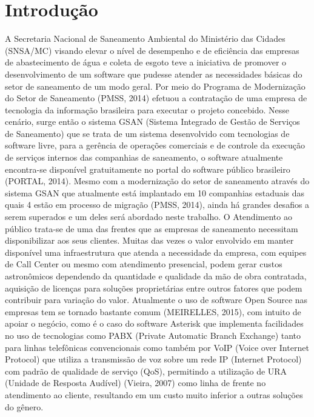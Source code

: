 \chapter*[Introdução]{Introdução}



A Secretaria Nacional de Saneamento Ambiental do Ministério das Cidades (SNSA/MC) visando elevar o nível de desempenho e de eficiência das empresas de abastecimento de água e coleta de esgoto teve a iniciativa de promover o desenvolvimento de um software que pudesse atender as necessidades básicas do setor de saneamento de um modo geral. Por meio do Programa de Modernização do Setor de Saneamento (PMSS, 2014) efetuou a contratação de uma empresa de tecnologia da informação brasileira para executar o projeto concebido.  Nesse cenário, surge então o sistema GSAN (Sistema Integrado de Gestão de Serviços de Saneamento) que se trata de um sistema desenvolvido com tecnologias de software livre, para a gerência de operações comerciais e de controle da execução de serviços internos das companhias de saneamento, o software atualmente encontra-se disponível gratuitamente no portal do software público brasileiro (PORTAL, 2014). Mesmo com a modernização do setor de saneamento através do sistema GSAN que atualmente está implantado em 10 companhias estaduais das quais 4 estão em processo de migração (PMSS, 2014), ainda há grandes desafios a serem superados e um deles será abordado neste trabalho.
O Atendimento ao público trata-se de uma das frentes que as empresas de saneamento necessitam disponibilizar aos seus clientes. Muitas das vezes o valor envolvido em manter disponível uma infraestrutura que atenda a necessidade da empresa, com equipes de Call Center ou mesmo com atendimento presencial, podem gerar custos astronômicos dependendo da quantidade e qualidade da mão de obra contratada, aquisição de licenças para soluções proprietárias entre outros fatores que podem contribuir para variação do valor. Atualmente o uso de software Open Source nas empresas tem se tornado bastante comum (MEIRELLES, 2015), com intuito de apoiar o negócio, como é o caso do software Asterisk que implementa facilidades no uso de tecnologias como PABX (Private Automatic Branch Exchange)  tanto para linhas telefônicas convencionais como também por VoIP (Voice over Internet Protocol) que utiliza a transmissão de voz sobre um rede IP (Internet Protocol) com padrão de qualidade de serviço (QoS), permitindo a utilização de URA (Unidade de Resposta Audível) (Vieira, 2007) como linha de frente no atendimento ao cliente, resultando em um custo muito inferior a outras soluções do gênero.


